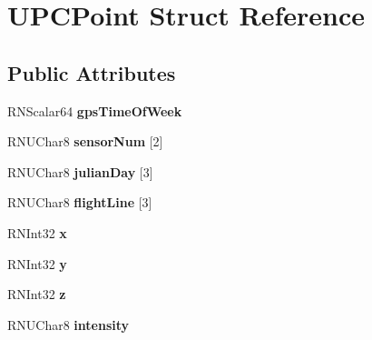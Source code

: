 \hypertarget{struct_u_p_c_point}{}\section{U\+P\+C\+Point Struct Reference}
\label{struct_u_p_c_point}
\subsection*{Public Attributes}
\begin{DoxyCompactItemize}
\item 
R\+N\+Scalar64 {\bfseries gps\+Time\+Of\+Week}\hypertarget{struct_u_p_c_point_a5f03cd59f145f3d671896f2ca1ad077e}{}\label{struct_u_p_c_point_a5f03cd59f145f3d671896f2ca1ad077e}

\item 
R\+N\+U\+Char8 {\bfseries sensor\+Num} \mbox{[}2\mbox{]}\hypertarget{struct_u_p_c_point_aaea0684b2fb06bafa9b82df7d938bd4d}{}\label{struct_u_p_c_point_aaea0684b2fb06bafa9b82df7d938bd4d}

\item 
R\+N\+U\+Char8 {\bfseries julian\+Day} \mbox{[}3\mbox{]}\hypertarget{struct_u_p_c_point_a2301956b0f293d6bfc63ee523613686b}{}\label{struct_u_p_c_point_a2301956b0f293d6bfc63ee523613686b}

\item 
R\+N\+U\+Char8 {\bfseries flight\+Line} \mbox{[}3\mbox{]}\hypertarget{struct_u_p_c_point_aad9499a912c40795490c5d84fc87258d}{}\label{struct_u_p_c_point_aad9499a912c40795490c5d84fc87258d}

\item 
R\+N\+Int32 {\bfseries x}\hypertarget{struct_u_p_c_point_a013a874fa6aeee3c87e7578276420aad}{}\label{struct_u_p_c_point_a013a874fa6aeee3c87e7578276420aad}

\item 
R\+N\+Int32 {\bfseries y}\hypertarget{struct_u_p_c_point_a5f24599bd22a7fc4670f61f5f7ddcf6b}{}\label{struct_u_p_c_point_a5f24599bd22a7fc4670f61f5f7ddcf6b}

\item 
R\+N\+Int32 {\bfseries z}\hypertarget{struct_u_p_c_point_a4fe84a9928b5f09579f507a96a4bd08b}{}\label{struct_u_p_c_point_a4fe84a9928b5f09579f507a96a4bd08b}

\item 
R\+N\+U\+Char8 {\bfseries intensity}\hypertarget{struct_u_p_c_point_a2419417d77d25e6c33256f21768b69ba}{}\label{struct_u_p_c_point_a2419417d77d25e6c33256f21768b69ba}


\end{DoxyCompactItemize}
